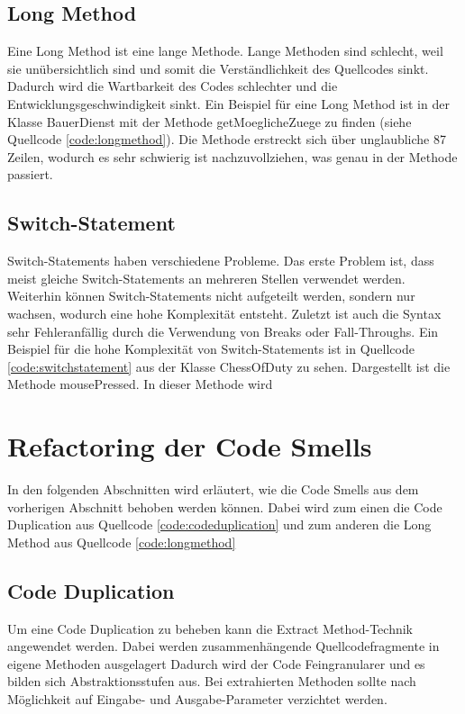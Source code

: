\subsection{Long Method}
Eine Long Method ist eine lange Methode. Lange Methoden sind schlecht, weil sie unübersichtlich sind und somit die Verständlichkeit des Quellcodes sinkt. Dadurch wird die Wartbarkeit des Codes schlechter und die Entwicklungsgeschwindigkeit sinkt. Ein Beispiel für eine Long Method ist in der Klasse BauerDienst mit der Methode getMoeglicheZuege zu finden (siehe Quellcode \ref{code:longmethod}). Die Methode erstreckt sich über unglaubliche 87 Zeilen, wodurch es sehr schwierig ist nachzuvollziehen, was genau in der Methode passiert.



\subsection{Switch-Statement}
Switch-Statements haben verschiedene Probleme.
Das erste Problem ist, dass meist gleiche Switch-Statements an mehreren Stellen verwendet werden. Weiterhin können Switch-Statements nicht aufgeteilt werden, sondern nur wachsen, wodurch eine hohe Komplexität entsteht. Zuletzt ist auch die Syntax sehr Fehleranfällig durch die Verwendung von Breaks oder Fall-Throughs. Ein Beispiel für die hohe Komplexität von Switch-Statements ist in Quellcode \ref{code:switchstatement} aus der Klasse ChessOfDuty zu sehen. Dargestellt ist die Methode mousePressed. In dieser Methode wird 



\section{Refactoring der Code Smells}
In den folgenden Abschnitten wird erläutert, wie die Code Smells aus dem vorherigen Abschnitt behoben werden können. Dabei wird zum einen die Code Duplication aus Quellcode \ref{code:codeduplication} und zum anderen die Long Method aus Quellcode \ref{code:longmethod}


\subsection{Code Duplication}
Um eine Code Duplication zu beheben kann die Extract Method-Technik angewendet werden. Dabei werden zusammenhängende Quellcodefragmente in eigene Methoden ausgelagert Dadurch wird der Code Feingranularer und es bilden sich Abstraktionsstufen aus. Bei extrahierten Methoden sollte nach Möglichkeit auf Eingabe- und Ausgabe-Parameter verzichtet werden.

